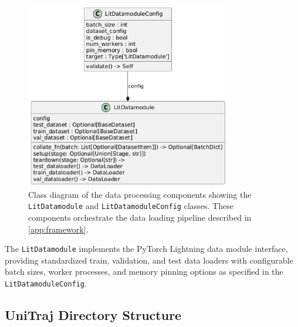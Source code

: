 \begin{figure}[H]
\centering
\includegraphics[width=0.8\textwidth]{figures/classes_LitDatmodule.png}
\caption{Class diagram of the data processing components showing the \texttt{LitDatamodule} and \texttt{LitDatamoduleConfig} classes. These components orchestrate the data loading pipeline described in \autoref{app:framework}.}
\label{fig:litdatamodule_class}
\end{figure}

The \texttt{LitDatamodule} implements the PyTorch Lightning data module interface, providing standardized train, validation, and test data loaders with configurable batch sizes, worker processes, and memory pinning options as specified in the \texttt{LitDatamoduleConfig}.

% 

\subsection{UniTraj Directory Structure}

